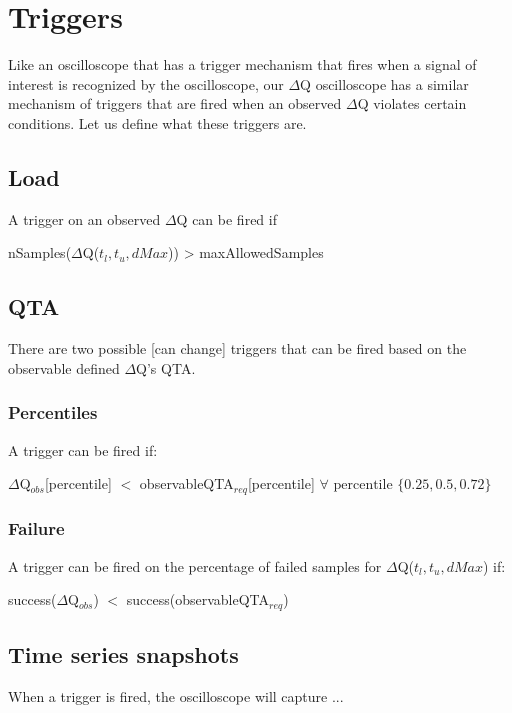 \section{Triggers}
    Like an oscilloscope that has a trigger mechanism that fires when a signal of interest is recognized by the oscilloscope, our $\Delta$Q oscilloscope has a similar mechanism of triggers that are fired when an observed $\Delta$Q violates certain conditions. Let us define what these triggers are.

    \subsection{Load}
        A trigger on an observed $\Delta$Q can be fired if 
    \begin{center}
        nSamples($\Delta$Q($t_l, t_u, dMax$)) > maxAllowedSamples 
    \end{center}

    \subsection{QTA}
        There are two possible [can change] triggers that can be fired based on the observable defined $\Delta$Q's QTA.   
        \subsubsection{Percentiles}
            A trigger can be fired if:
        \begin{center}
            $\Delta$Q$_{obs}$[percentile] $<$ observableQTA$_{req}$[percentile] \quad $\forall \text{ percentile } \{0.25, 0.5, 0.72\}$
        \end{center}
        \subsubsection{Failure}
            A trigger can be fired on the percentage of failed samples for $\Delta$Q($t_l, t_u, dMax$) if:
        \begin{center}
            success($\Delta$Q$_{obs}$) $<$ success(observableQTA$_{req}$)
        \end{center}

    \subsection{Time series snapshots}
        When a trigger is fired, the oscilloscope will capture ...
